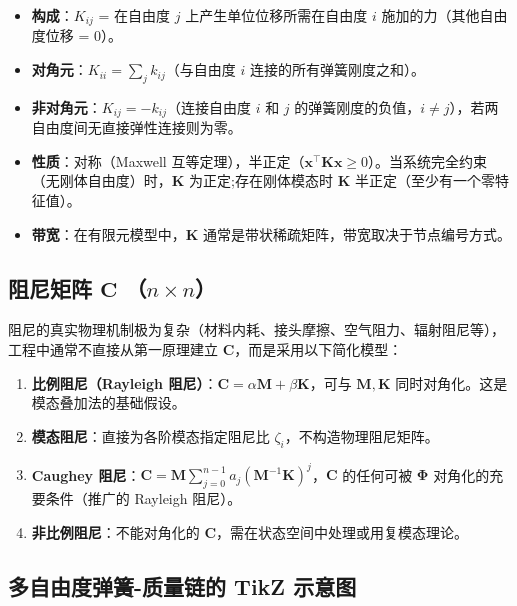 \begin{itemize}
\item \textbf{构成}：$K_{ij}$ = 在自由度 $j$ 上产生单位位移所需在自由度 $i$ 施加的力（其他自由度位移 = 0）。
\item \textbf{对角元}：$K_{ii} = \sum_{j} k_{ij}$（与自由度 $i$ 连接的所有弹簧刚度之和）。
\item \textbf{非对角元}：$K_{ij} = -k_{ij}$（连接自由度 $i$ 和 $j$ 的弹簧刚度的负值，$i \neq j$），若两自由度间无直接弹性连接则为零。
\item \textbf{性质}：对称（Maxwell 互等定理），半正定（$\mathbf{x}^{\top}\mathbf{K}\mathbf{x} \geq 0$）。当系统完全约束（无刚体自由度）时，$\mathbf{K}$ 为正定;存在刚体模态时 $\mathbf{K}$ 半正定（至少有一个零特征值）。
\item \textbf{带宽}：在有限元模型中，$\mathbf{K}$ 通常是带状稀疏矩阵，带宽取决于节点编号方式。
\end{itemize}

\subsection{阻尼矩阵 $\mathbf{C}$ （$n \times n$）}

阻尼的真实物理机制极为复杂（材料内耗、接头摩擦、空气阻力、辐射阻尼等），工程中通常不直接从第一原理建立 $\mathbf{C}$，而是采用以下简化模型：

\begin{enumerate}
\item \textbf{比例阻尼（Rayleigh 阻尼）}：$\mathbf{C} = \alpha\mathbf{M} + \beta\mathbf{K}$，可与 $\mathbf{M}, \mathbf{K}$ 同时对角化。这是模态叠加法的基础假设。
\item \textbf{模态阻尼}：直接为各阶模态指定阻尼比 $\zeta_i$，不构造物理阻尼矩阵。
\item \textbf{Caughey 阻尼}：$\mathbf{C} = \mathbf{M} \sum_{j=0}^{n-1} a_j (\mathbf{M}^{-1}\mathbf{K})^j$，$\mathbf{C}$ 的任何可被 $\mathbf{\Phi}$ 对角化的充要条件（推广的 Rayleigh 阻尼）。
\item \textbf{非比例阻尼}：不能对角化的 $\mathbf{C}$，需在状态空间中处理或用复模态理论。
\end{enumerate}

\subsection{多自由度弹簧-质量链的 TikZ 示意图}

